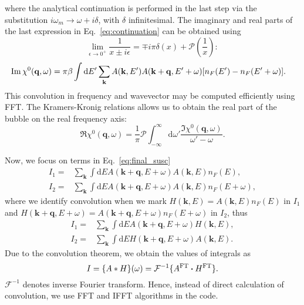 \documentclass[preprint,prb,amsmath,superscriptaddress,showpacs]{revtex4}
\newcommand{\bk}{\mathbf{k}}
\newcommand{\bq}{\mathbf{q}}
\begin{document}
where the analytical continuation is performed in the last step via the
substitution $i\omega_m \rightarrow \omega + i\delta$, with $\delta$
infinitesimal. The imaginary and real parts of the last expression in
Eq.~\ref{eq:continuation} can be obtained using
%
\begin{equation}
  \lim_{\epsilon \rightarrow 0^{+}} \frac{1}{x \pm i\epsilon} = \mp
  i\pi\delta (x) + \mathcal{P}\left( \frac{1}{x} \right):
\end{equation}
%
\begin{equation}
  \begin{aligned}
    \Im \chi^0(\bq, \omega)
    &= \pi \beta
    \int
    \mathrm{d} E'
    \sum_{\bk} A(\bk, E') 
    A(\bk + \bq, E' + \omega)
    \qty[n_F(E') - n_F(E' + \omega) ].
    \end{aligned}
\end{equation}
This convolution in frequency and wavevector may be computed
efficiently using FFT. The Kramers-Kronig relations allows us
to obtain the real part of the bubble on the real frequency axis:
%
\begin{equation}
  \Re \chi^0(\bq, \omega) =
  \dfrac{1}{\pi} \mathcal{P}
  \int_{-\infty}^{\infty}
  \mathrm{d} \omega' \frac{\Im \chi^0(\bq, \omega)}{\omega' - \omega}.
\end{equation}
%

\newpage

Now, we focus on terms in Eq.~\eqref{eq:final_susc}
%
\begin{align*}
I_1 =& \sum_{\mathbf{k}} \int  \mathrm{d}E A(\mathbf{k} +
       \mathbf{q}, E + \omega) A(\mathbf{k}, E) n_F(E), \\
I_2 =& \sum_{\mathbf{k}} \int  \mathrm{d}E A(\mathbf{k} +
       \mathbf{q}, E + \omega) A(\mathbf{k}, E) n_F(E+\omega),
\end{align*}
%
where we identify convolution when we mark $H(\mathbf{k}, E) =
A(\mathbf{k}, E) n_F(E)$ in $I_1$ and $H(\mathbf{k}+\mathbf{q}, E+\omega) =
A(\mathbf{k} + \mathbf{q}, E + \omega) n_F(E+\omega)$ in $I_2$, thus
%
\begin{align*}
I_1 =& \sum_{\mathbf{k}} \int  \mathrm{d}E A(\mathbf{k} +
       \mathbf{q}, E + \omega) H(\mathbf{k}, E), \\
I_2 =& \sum_{\mathbf{k}} \int  \mathrm{d}E H(\mathbf{k} +
       \mathbf{q}, E + \omega) A(\mathbf{k}, E).
\end{align*}
%
Due to the convolution theorem, we obtain the values of integrals as
%
\begin{equation}
I = \{ A * H \}(\omega) = \mathcal{F}^{-1} \{ A^{\mathrm{FT}}
\dotproduct H^{\mathrm{FT}} \}.
\end{equation}
%
$\mathcal{F}^{-1}$ denotes inverse Fourier transform. Hence, instead of direct
calculation of convolution, we use FFT and IFFT algorithms in the
code.
\end{document}
